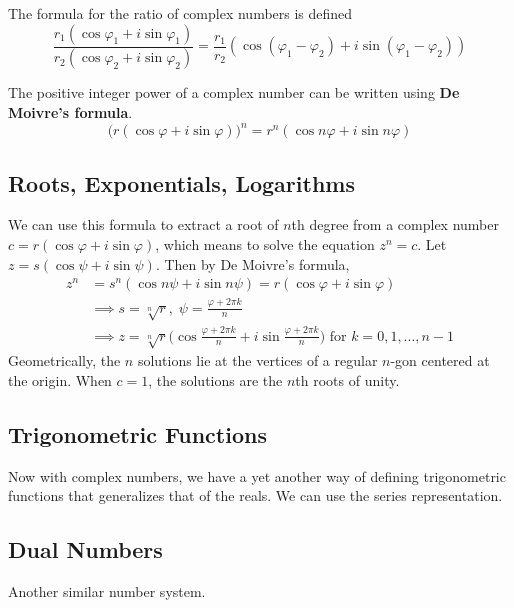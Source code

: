   \begin{corollary}
    The formula for the ratio of complex numbers is defined
    \begin{equation}
      \frac{r_1 (\cos{\varphi_1} + i \sin{\varphi_1})}{r_2 (\cos{\varphi_2} + i \sin{\varphi_2})} = \frac{r_1}{r_2} (\cos{(\varphi_1 - \varphi_2)} + i \sin{(\varphi_1 - \varphi_2)})
    \end{equation}
  \end{corollary}

  \begin{corollary}
    The positive integer power of a complex number can be written using \textbf{De Moivre's formula}. 
    \begin{equation}
      \big(r(\cos{\varphi} + i \sin{\varphi})\big)^n = r^n (\cos{n \varphi} + i \sin{n \varphi})
    \end{equation}
  \end{corollary}

\subsection{Roots, Exponentials, Logarithms}

  We can use this formula to extract a root of $n$th degree from a complex number $c = r(\cos{\varphi} + i \sin{\varphi})$, which means to solve the equation $z^n = c$. Let $z = s (\cos{\psi} + i \sin{\psi})$. Then by De Moivre's formula, 
  \begin{align*}
    z^n & = s^n (\cos{n \psi} + i \sin{n \psi}) = r(\cos{\varphi} + i \sin{\varphi}) \\
    & \implies s = \sqrt[n]{r}, \; \psi = \frac{\varphi + 2\pi k}{n} \\
    & \implies z = \sqrt[n]{r} \bigg( \cos{\frac{\varphi + 2\pi k}{n}} + i \sin{\frac{\varphi + 2\pi k}{n}}\bigg) \text{ for } k = 0, 1, ..., n-1
  \end{align*}
  Geometrically, the $n$ solutions lie at the vertices of a regular $n$-gon centered at the origin. When $c = 1$, the solutions are the $n$th roots of unity.

\subsection{Trigonometric Functions}

  Now with complex numbers, we have a yet another way of defining trigonometric functions that generalizes that of the reals. We can use the series representation. 

\subsection{Dual Numbers}

  Another similar number system. 

